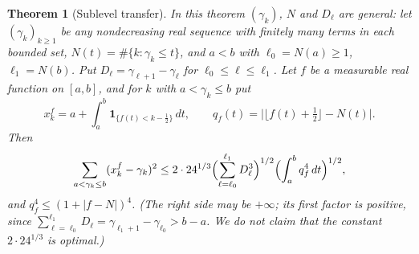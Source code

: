 \documentclass[11pt,a4paper]{article}
\numberwithin{equation}{section}
\newtheorem{theorem}{Theorem}[section]
\theoremstyle{definition}
\theoremstyle{remark}
\newcommand{\Ind}{\mathbf 1}
\begin{document}
\begin{theorem}[Sublevel transfer]\label{thm:transfer}
In this theorem $(\gamma_k)$, $N$ and $D_\ell$ are general: let $(\gamma_k)_{k\ge1}$ be any nondecreasing real sequence with finitely many terms in each bounded set, $N(t)=\#\{k:\gamma_k\le t\}$, and $a<b$ with $\ell_0=N(a)\ge1$, $\ell_1=N(b)$. Put $D_\ell=\gamma_{\ell+1}-\gamma_\ell$ for $\ell_0\le\ell\le\ell_1$. Let $f$ be a measurable real function on $[a,b]$, and for $k$ with $a<\gamma_k\le b$ put
\[
x^f_k=a+\int_a^b\Ind_{\{f(t)<k-\frac12\}}\,dt,\qquad q_f(t)=\bigl|\lfloor f(t)+\tfrac12\rfloor-N(t)\bigr| .
\]
Then
\begin{equation}
\sum_{a<\gamma_k\le b}(x^f_k-\gamma_k)^2\le2\cdot24^{1/3}\Bigl(\sum_{\ell=\ell_0}^{\ell_1}D_\ell^3\Bigr)^{1/2}\Bigl(\int_a^bq_f^4\,dt\Bigr)^{1/2},
\label{eq:transfer}
\end{equation}
and $q_f^4\le(1+|f-N|)^4$. (The right side may be $+\infty$; its first factor is positive, since $\sum_{\ell=\ell_0}^{\ell_1}D_\ell=\gamma_{\ell_1+1}-\gamma_{\ell_0}>b-a$. We do not claim that the constant $2\cdot24^{1/3}$ is optimal.)
\end{theorem}
\end{document}
